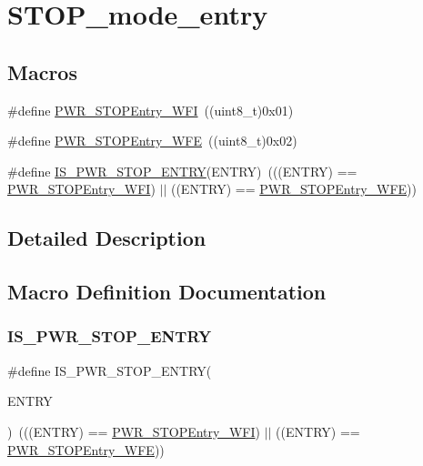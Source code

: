 \hypertarget{group___s_t_o_p__mode__entry}{}\section{S\+T\+O\+P\+\_\+mode\+\_\+entry}
\label{group___s_t_o_p__mode__entry}
\subsection*{Macros}
\begin{DoxyCompactItemize}
\item 
\#define \mbox{\hyperlink{group___s_t_o_p__mode__entry_gaa1e1362f3d0b93e8f5f674e18cfc96c4}{P\+W\+R\+\_\+\+S\+T\+O\+P\+Entry\+\_\+\+W\+FI}}~((uint8\+\_\+t)0x01)
\item 
\#define \mbox{\hyperlink{group___s_t_o_p__mode__entry_gaac98ac55fb8764121d4168d99c9b369e}{P\+W\+R\+\_\+\+S\+T\+O\+P\+Entry\+\_\+\+W\+FE}}~((uint8\+\_\+t)0x02)
\item 
\#define \mbox{\hyperlink{group___s_t_o_p__mode__entry_ga4a94eb1f400dec6e486fbc229cbea8a0}{I\+S\+\_\+\+P\+W\+R\+\_\+\+S\+T\+O\+P\+\_\+\+E\+N\+T\+RY}}(E\+N\+T\+RY)~(((E\+N\+T\+RY) == \mbox{\hyperlink{group___s_t_o_p__mode__entry_gaa1e1362f3d0b93e8f5f674e18cfc96c4}{P\+W\+R\+\_\+\+S\+T\+O\+P\+Entry\+\_\+\+W\+FI}}) $\vert$$\vert$ ((E\+N\+T\+RY) == \mbox{\hyperlink{group___s_t_o_p__mode__entry_gaac98ac55fb8764121d4168d99c9b369e}{P\+W\+R\+\_\+\+S\+T\+O\+P\+Entry\+\_\+\+W\+FE}}))
\end{DoxyCompactItemize}


\subsection{Detailed Description}


\subsection{Macro Definition Documentation}
\mbox{\label{group___s_t_o_p__mode__entry_ga4a94eb1f400dec6e486fbc229cbea8a0}} 
\subsubsection{\texorpdfstring{IS\_PWR\_STOP\_ENTRY}{IS\_PWR\_STOP\_ENTRY}}
{\footnotesize\ttfamily \#define I\+S\+\_\+\+P\+W\+R\+\_\+\+S\+T\+O\+P\+\_\+\+E\+N\+T\+RY(\begin{DoxyParamCaption}\item[{}]{E\+N\+T\+RY }\end{DoxyParamCaption})~(((E\+N\+T\+RY) == \mbox{\hyperlink{group___s_t_o_p__mode__entry_gaa1e1362f3d0b93e8f5f674e18cfc96c4}{P\+W\+R\+\_\+\+S\+T\+O\+P\+Entry\+\_\+\+W\+FI}}) $\vert$$\vert$ ((E\+N\+T\+RY) == \mbox{\hyperlink{group___s_t_o_p__mode__entry_gaac98ac55fb8764121d4168d99c9b369e}{P\+W\+R\+\_\+\+S\+T\+O\+P\+Entry\+\_\+\+W\+FE}}))}

